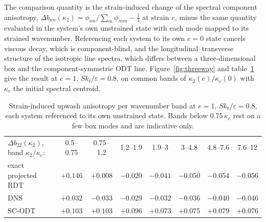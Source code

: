\documentclass[11pt,a4paper]{article}
\begin{document}
The comparison quantity is the strain-induced change of the spectral
component anisotropy,
$\Delta b_{nn}(\kappa_2)=\phi_{nn}/\sum_m\phi_{mm}-\tfrac13$ at strain $e$,
minus the same quantity evaluated in the system's own unstrained state with
each mode mapped to its strained wavenumber. Referencing each system to its
own $e=0$ state cancels viscous decay, which is component-blind, and the
longitudinal--transverse structure of the isotropic line spectra, which
differs between a three-dimensional box and the component-symmetric ODT
line. Figure~\ref{fig:threeway} and table~\ref{tab:threeway} give the
result at $e=1$, $Sk_t/\varepsilon=0.8$, on common bands of
$\kappa_2(e)/\kappa_c(0)$ with $\kappa_c$ the initial spectral centroid.

\begin{table}
  \centering\small
  \begin{tabular}{lccccccc}
  $\Delta b_{22}(\kappa_2)$, band $\kappa_2/\kappa_c$: & 0.5--0.75 & 0.75--1.2 & 1.2--1.9 & 1.9--3 & 3--4.8 & 4.8--7.6 & 7.6--12\\[2pt]
  exact projected RDT & $+0.146$ & $+0.008$ & $-0.020$ & $-0.041$ & $-0.050$ & $-0.054$ & $-0.056$\\
  DNS                 & $+0.032$ & $-0.033$ & $-0.029$ & $-0.032$ & $-0.036$ & $-0.040$ & $-0.046$\\
  SC-ODT              & $+0.103$ & $+0.103$ & $+0.096$ & $+0.073$ & $+0.075$ & $+0.079$ & $+0.076$\\
  \end{tabular}
  \caption{Strain-induced upwash anisotropy per wavenumber band at $e=1$,
  $Sk_t/\varepsilon=0.8$, each system referenced to its own unstrained
  state. Bands below $0.75\,\kappa_c$ rest on a few box modes and are
  indicative only.}
  \label{tab:threeway}
\end{table}
\end{document}
